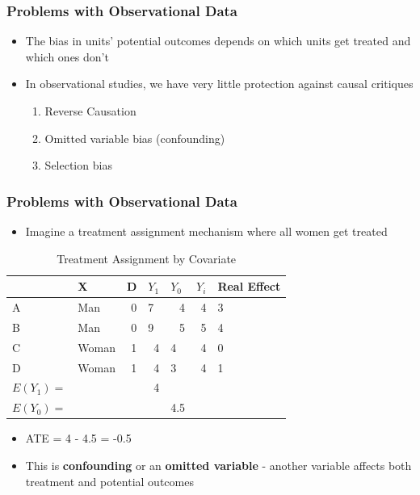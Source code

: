 \documentclass[xcolor=x11names,compress]{beamer}\usepackage[]{graphicx}\usepackage[]{color}
\renewcommand{\(}{\begin{columns}}
\renewcommand{\)}{\end{columns}}
\newcommand{\<}[1]{\begin{column}{#1}}
\renewcommand{\>}{\end{column}}
\begin{document}
\begin{frame}
\frametitle{Problems with Observational Data}
\begin{itemize}
\item The bias in units' potential outcomes depends on which units get treated and which ones don't
\item In observational studies, we have very little protection against causal critiques
\begin{enumerate}
\item Reverse Causation
\item Omitted variable bias (confounding)
\item Selection bias
\end{enumerate}
\end{itemize}
\end{frame}

\begin{frame}
\frametitle{Problems with Observational Data}
\begin{itemize}
\item Imagine a treatment assignment mechanism where all women get treated
\end{itemize}
\begin{table}[htbp]
  \centering
  \caption{Treatment Assignment by Covariate}
    \begin{tabular}{|l|l|r|r|l|r|l|}
    \hline
          & X     & \multicolumn{1}{l|}{D} & \multicolumn{1}{l|}{$Y_1$} & $Y_0$  & \multicolumn{1}{l|}{$Y_i$} & Real Effect \bigstrut\\
    \hline
    A     & Man   & 0     & \multicolumn{1}{l|}{7} & \multicolumn{1}{r|}{\cellcolor{teal}4} & 4     & 3 \bigstrut\\
    \hline
    B     & Man   & 0     & \multicolumn{1}{l|}{9} & \multicolumn{1}{r|}{\cellcolor{teal}5} & 5     & 4 \bigstrut\\
    \hline
    C     & Woman & 1     & \cellcolor{teal}4     & 4     & 4     & 0 \bigstrut\\
    \hline
    D     & Woman & 1     & \cellcolor{teal}4     & 3     & 4     & 1 \bigstrut\\
    \hline\pause
    $E(Y_1)=$ & & & 4 & & \bigstrut\\
    \hline
    $E(Y_0)=$ & &  & & 4.5 & \bigstrut\\
    \hline
    \end{tabular}%
  \label{tab:addlabel}%
\end{table}%
\begin{itemize}
\pause
\item ATE = 4 - 4.5 = -0.5
\item This is \textbf{confounding} or an \textbf{omitted variable} - another variable affects both treatment and potential outcomes
\end{itemize}
\end{frame}
\end{document}

